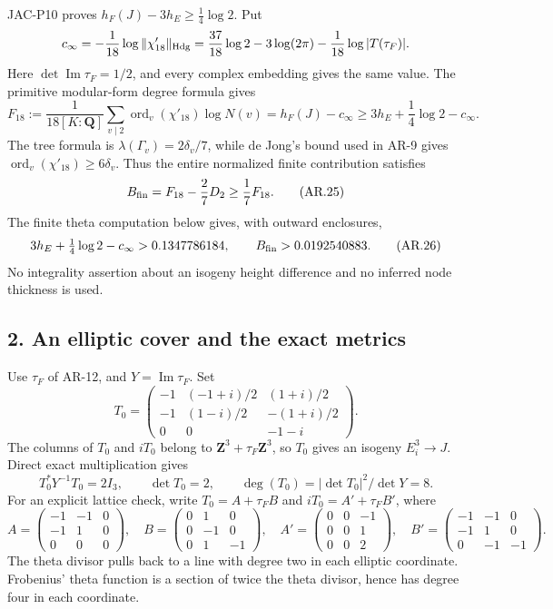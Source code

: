\documentclass[11pt,a4paper]{article}
\begin{document}
JAC-P10 proves \(h_F(J)-3h_E\ge\frac14\log2\). Put \[
c_\infty=-\frac1{18}\log\|\chi'_{18}\|_{\rm Hdg}
 =\frac{37}{18}\log2-3\log(2\pi)-\frac1{18}\log|T(\tau_F)|.
\] Here \(\det\operatorname{Im}\tau_F=1/2\), and every complex embedding
gives the same value. The primitive modular-form degree formula gives \[
F_{18}:=\frac1{18[K:\mathbf Q]}
 \sum_{v\mid2}\operatorname{ord}_v(\chi'_{18})\log N(v)
 =h_F(J)-c_\infty
 \ge3h_E+\frac14\log2-c_\infty.
\tag{AR.24}
\] The tree formula is \(\lambda(\Gamma_v)=2\delta_v/7\), while de
Jong's bound used in AR-9 gives
\(\operatorname{ord}_v(\chi'_{18})\ge6\delta_v\). Thus the entire
normalized finite contribution satisfies \[
B_{\rm fin}=F_{18}-\frac27D_2\ge\frac17F_{18}.
\tag{AR.25}
\] The finite theta computation below gives, with outward enclosures, \[
3h_E+\tfrac14\log2-c_\infty>0.1347786184,
\qquad B_{\rm fin}>0.0192540883.
\tag{AR.26}
\] No integrality assertion about an isogeny height difference and no
inferred node thickness is used.

\subsection{2. An elliptic cover and the exact
metrics}\label{an-elliptic-cover-and-the-exact-metrics}

Use \(\tau_F\) of AR-12, and \(Y=\operatorname{Im}\tau_F\). Set \[
T_0=
\begin{pmatrix}
-1&(-1+i)/2&(1+i)/2\\
-1&(1-i)/2&-(1+i)/2\\
0&0&-1-i
\end{pmatrix}.
\] The columns of \(T_0\) and \(iT_0\) belong to
\(\mathbf Z^3+\tau_F\mathbf Z^3\), so \(T_0\) gives an isogeny
\(E_i^3\to J\). Direct exact multiplication gives \[
T_0^*Y^{-1}T_0=2I_3,\qquad \det T_0=2,
\qquad\deg(T_0)=|\det T_0|^2/\det Y=8.
\] For an explicit lattice check, write \(T_0=A+\tau_F B\) and
\(iT_0=A'+\tau_F B'\), where \[
A=\begin{pmatrix}-1&-1&0\\-1&1&0\\0&0&0\end{pmatrix},
\quad
B=\begin{pmatrix}0&1&0\\0&-1&0\\0&1&-1\end{pmatrix},
\quad
A'=\begin{pmatrix}0&0&-1\\0&0&1\\0&0&2\end{pmatrix},
\quad
B'=\begin{pmatrix}-1&-1&0\\-1&1&0\\0&-1&-1\end{pmatrix}.
\] The theta divisor pulls back to a line with degree two in each
elliptic coordinate. Frobenius' theta function is a section of twice the
theta divisor, hence has degree four in each coordinate.
\end{document}
